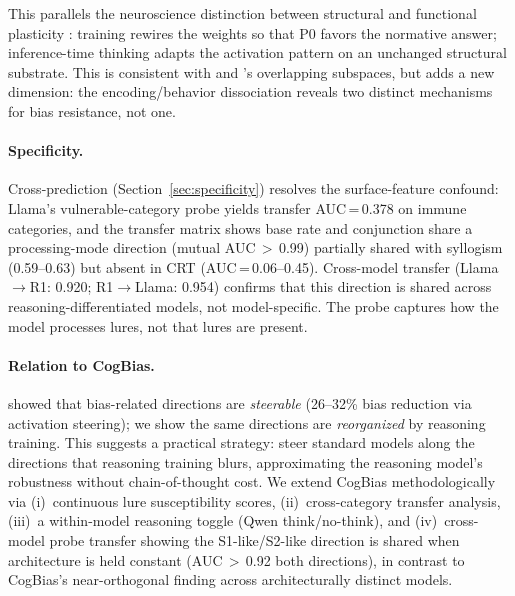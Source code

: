 \documentclass[accepted]{article}
\newcommand{\sone}{S1-like}
\newcommand{\stwo}{S2-like}
\begin{document}
This parallels the neuroscience distinction between structural and
functional plasticity \citep{kolb2013brain}: training rewires the weights
so that P0 favors the normative answer; inference-time thinking adapts
the activation pattern on an unchanged structural substrate.  This is
consistent with \citet{ziabari2025reasoning} and
\citet{codaforno2025dual}'s overlapping subspaces, but adds a new
dimension: the encoding/behavior dissociation reveals two distinct
mechanisms for bias resistance, not one.

\paragraph{Specificity.}
Cross-prediction (Section~\ref{sec:specificity}) resolves the
surface-feature confound: Llama's vulnerable-category probe yields
transfer AUC\,=\,0.378 on immune categories, and the transfer matrix
shows base rate and conjunction share a processing-mode direction
(mutual AUC\,$>$\,0.99) partially shared with syllogism (0.59--0.63)
but absent in CRT (AUC\,=\,0.06--0.45).
Cross-model transfer (Llama$\to$R1: 0.920; R1$\to$Llama: 0.954)
confirms that this direction is shared across reasoning-differentiated
models, not model-specific.  The probe captures how the model processes
lures, not that lures are present.

\paragraph{Relation to CogBias.}
\citet{huang2026cogbias} showed that bias-related directions are
\emph{steerable} (26--32\% bias reduction via activation steering);
we show the same directions are \emph{reorganized} by reasoning training.
This suggests a practical strategy: steer standard models along the
directions that reasoning training blurs, approximating the reasoning
model's robustness without chain-of-thought cost.  We extend CogBias
methodologically via (i)~continuous lure susceptibility scores,
(ii)~cross-category transfer analysis, (iii)~a within-model
reasoning toggle (Qwen think/no-think), and (iv)~cross-model probe
transfer showing the \sone{}/\stwo{} direction is shared when
architecture is held constant (AUC\,$>$\,0.92 both directions), in
contrast to CogBias's near-orthogonal finding across architecturally
distinct models.
\end{document}
